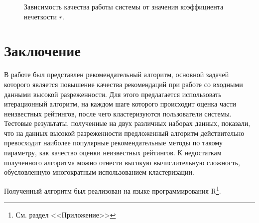 \documentclass[a4paper, 12pt]{article} %
\begin{document}
\begin{figure}[h]
\begin{minipage}[h]{0.49\linewidth}
	\end{minipage}
	\caption{Зависимость качества работы системы от значения коэффициента нечеткости $r$.}
	\label{fig:fuzz}
	\end{figure}

\par
	
\section{Заключение}
В работе был представлен рекомендательный алгоритм, основной задачей которого является повышение качества рекомендаций при работе со входными данными высокой разреженности. Для этого предлагается использовать итерационный алгоритм, на каждом шаге которого происходит оценка части неизвестных рейтингов, после чего кластеризуются пользователи системы. Тестовые результаты, полученные на двух различных наборах данных, показали, что на данных высокой разреженности предложенный алгоритм действительно превосходит наиболее популярные рекомендательные методы по такому параметру, как качество оценки неизвестных рейтингов.  
К недостаткам полученного алгоритма можно отнести высокую вычислительную сложность, обусловленную многократным использованием кластеризации.
\par
Полученный алгоритм был реализован на языке программирования R\footnote{См. раздел <<Приложение>>}.
\end{document}
